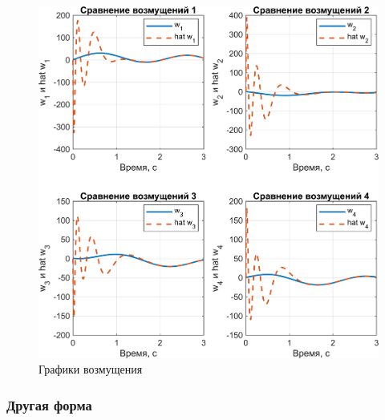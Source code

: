 \begin{figure}[H]
    \centering
    \includegraphics[width=\linewidth]{figs/task3_3.png}
    \caption{Графики возмущения}
    \label{fig:3.3}
\end{figure}


\subsubsection{Другая форма}

